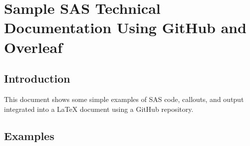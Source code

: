 \documentclass{book}
\numberwithin{equation}{section}
\begin{document}
\chapter*{Sample SAS Technical Documentation Using GitHub and Overleaf}
\startcontents[chapters]

\section{Introduction}
\label{Section:SESUGIntro}
This document shows some simple examples of SAS code, callouts, and output integrated into a LaTeX document using a GitHub repository.

\section{Examples}
\label{Section:SESUGExamples}
\end{document}
